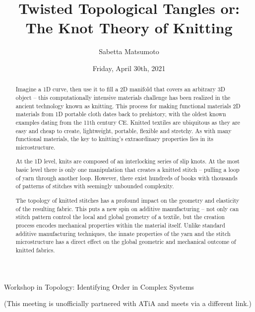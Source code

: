 \documentclass{UAmathtalk}
\author{Sabetta Matsumoto}
\title{Twisted Topological Tangles or: The Knot Theory of Knitting}
\date{Friday, April 30th, 2021}
\begin{document}
\maketitle

\begin{center}
\Large{Workshop in Topology: Identifying Order in Complex Systems}

\normalsize{(This meeting is unofficially partnered with ATiA and meets via a different link.)}
\end{center}

\begin{abstract}
Imagine a 1D curve, then use it to fill a 2D manifold that covers an arbitrary 3D object – this computationally intensive materials challenge has been realized in the ancient technology known as knitting. This process for making functional materials 2D materials from 1D portable cloth dates back to prehistory, with the oldest known examples dating from the 11th century CE. Knitted textiles are ubiquitous as they are easy and cheap to create, lightweight, portable, flexible and stretchy. As with many functional materials, the key to knitting’s extraordinary properties lies in its microstructure.

At the 1D level, knits are composed of an interlocking series of slip knots. At the most basic level there is only one manipulation that creates a knitted stitch – pulling a loop of yarn through another loop. However, there exist hundreds of books with thousands of patterns of stitches with seemingly unbounded complexity.

The topology of knitted stitches has a profound impact on the geometry and elasticity of the resulting fabric. This puts a new spin on additive manufacturing – not only can stitch pattern control the local and global geometry of a textile, but the creation process encodes mechanical properties within the material itself. Unlike standard additive manufacturing techniques, the innate properties of the yarn and the stitch microstructure has a direct effect on the global geometric and mechanical outcome of knitted fabrics.
\end{abstract}
\end{document}
